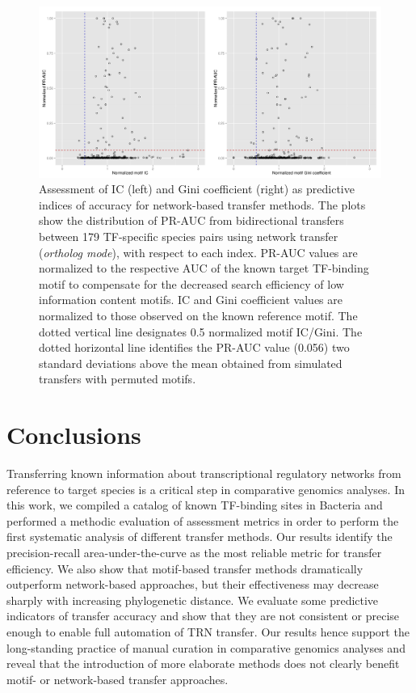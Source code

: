 \begin{figure}
  \centering
  \includegraphics[width=\textwidth]{figures/chapter3/ic-and-gini}
  \caption{Assessment of IC (left) and Gini coefficient (right) as predictive
    indices of accuracy for network-based transfer methods. The plots show the
    distribution of PR-AUC from bidirectional transfers between 179 TF-specific
    species pairs using network transfer (\textit{ortholog mode}), with respect
    to each index. PR-AUC values are normalized to the respective AUC of the
    known target TF-binding motif to compensate for the decreased search
    efficiency of low information content motifs. IC and Gini coefficient
    values are normalized to those observed on the known reference motif. The
    dotted vertical line designates 0.5 normalized motif IC/Gini. The dotted
    horizontal line identifies the PR-AUC value (0.056) two standard deviations
    above the mean obtained from simulated transfers with permuted motifs.
  }
\label{fig:ic-and-gini}
\end{figure}

\section{Conclusions}

Transferring known information about transcriptional regulatory networks from
reference to target species is a critical step in comparative genomics
analyses. In this work, we compiled a catalog of known TF-binding sites in
Bacteria and performed a methodic evaluation of assessment metrics in order to
perform the first systematic analysis of different transfer methods. Our
results identify the precision-recall area-under-the-curve as the most reliable
metric for transfer efficiency. We also show that motif-based transfer methods
dramatically outperform network-based approaches, but their effectiveness may
decrease sharply with increasing phylogenetic distance. We evaluate some
predictive indicators of transfer accuracy and show that they are not
consistent or precise enough to enable full automation of TRN transfer. Our
results hence support the long-standing practice of manual curation in
comparative genomics analyses and reveal that the introduction of more
elaborate methods does not clearly benefit motif- or network-based transfer
approaches.

